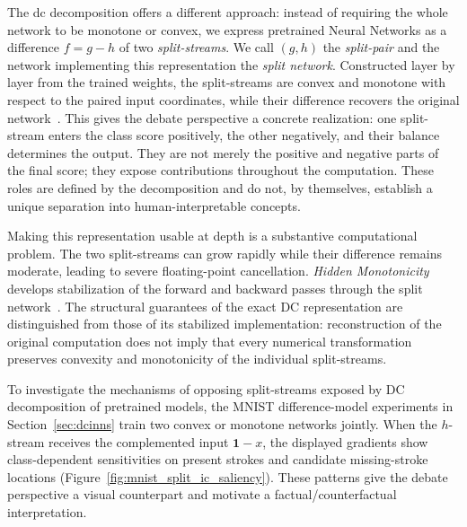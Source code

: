 The \ac{dc} decomposition offers a different approach: instead of requiring the whole network to be monotone or convex, we express pretrained Neural Networks as a difference $f=g-h$ of two \emph{split-streams}. We call $(g,h)$ the \emph{split-pair} and the network implementing this representation the \emph{split network}. Constructed layer by layer from the trained weights, the split-streams are convex and monotone with respect to the paired input coordinates, while their difference recovers the original network~\parencite{hiddenMono}. This gives the debate perspective a concrete realization: one split-stream enters the class score positively, the other negatively, and their balance determines the output. They are not merely the positive and negative parts of the final score; they expose contributions throughout the computation. These roles are defined by the decomposition and do not, by themselves, establish a unique separation into human-interpretable concepts.

Making this representation usable at depth is a substantive computational problem. The two split-streams can grow rapidly while their difference remains moderate, leading to severe floating-point cancellation. \emph{Hidden Monotonicity} develops stabilization of the forward and backward passes through the split network~\parencite{hiddenMono}. The structural guarantees of the exact DC representation are distinguished from those of its stabilized implementation: reconstruction of the original computation does not imply that every numerical transformation preserves convexity and monotonicity of the individual split-streams.

To investigate the mechanisms of opposing split-streams exposed by DC decomposition of pretrained models, the MNIST difference-model experiments in Section~\ref{sec:dcinns} train two convex or monotone networks jointly. When the $h$-stream receives the complemented input $\mathbf{1}-x$, the displayed gradients show class-dependent sensitivities on present strokes and candidate missing-stroke locations (Figure~\ref{fig:mnist_split_ic_saliency}). These patterns give the debate perspective a visual counterpart and motivate a factual/counterfactual interpretation.

